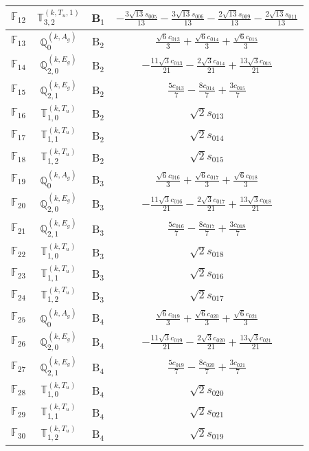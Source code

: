 \documentclass[fleqn,10pt,landscape]{article}
\begin{document}
\begin{itemize}
\begin{center}
\begin{longtable}{c|c|c|c}
$ \mathbb{F}_{12} $ & $\mathbb{T}_{3,2}^{(k,T_{u},1)}$ & B$_{1}$ & $- \frac{3 \sqrt{13} s_{005}}{13} - \frac{3 \sqrt{13} s_{006}}{13} - \frac{2 \sqrt{13} s_{009}}{13} - \frac{2 \sqrt{13} s_{011}}{13}$ \\ \hline
$ \mathbb{F}_{13} $ & $\mathbb{Q}_{0}^{(k,A_{g})}$ & B$_{2}$ & $\frac{\sqrt{6} c_{013}}{3} + \frac{\sqrt{6} c_{014}}{3} + \frac{\sqrt{6} c_{015}}{3}$ \\
$ \mathbb{F}_{14} $ & $\mathbb{Q}_{2,0}^{(k,E_{g})}$ & B$_{2}$ & $- \frac{11 \sqrt{3} c_{013}}{21} - \frac{2 \sqrt{3} c_{014}}{21} + \frac{13 \sqrt{3} c_{015}}{21}$ \\
$ \mathbb{F}_{15} $ & $\mathbb{Q}_{2,1}^{(k,E_{g})}$ & B$_{2}$ & $\frac{5 c_{013}}{7} - \frac{8 c_{014}}{7} + \frac{3 c_{015}}{7}$ \\
$ \mathbb{F}_{16} $ & $\mathbb{T}_{1,0}^{(k,T_{u})}$ & B$_{2}$ & $\sqrt{2} s_{013}$ \\
$ \mathbb{F}_{17} $ & $\mathbb{T}_{1,1}^{(k,T_{u})}$ & B$_{2}$ & $\sqrt{2} s_{014}$ \\
$ \mathbb{F}_{18} $ & $\mathbb{T}_{1,2}^{(k,T_{u})}$ & B$_{2}$ & $\sqrt{2} s_{015}$ \\ \hline
$ \mathbb{F}_{19} $ & $\mathbb{Q}_{0}^{(k,A_{g})}$ & B$_{3}$ & $\frac{\sqrt{6} c_{016}}{3} + \frac{\sqrt{6} c_{017}}{3} + \frac{\sqrt{6} c_{018}}{3}$ \\
$ \mathbb{F}_{20} $ & $\mathbb{Q}_{2,0}^{(k,E_{g})}$ & B$_{3}$ & $- \frac{11 \sqrt{3} c_{016}}{21} - \frac{2 \sqrt{3} c_{017}}{21} + \frac{13 \sqrt{3} c_{018}}{21}$ \\
$ \mathbb{F}_{21} $ & $\mathbb{Q}_{2,1}^{(k,E_{g})}$ & B$_{3}$ & $\frac{5 c_{016}}{7} - \frac{8 c_{017}}{7} + \frac{3 c_{018}}{7}$ \\
$ \mathbb{F}_{22} $ & $\mathbb{T}_{1,0}^{(k,T_{u})}$ & B$_{3}$ & $\sqrt{2} s_{018}$ \\
$ \mathbb{F}_{23} $ & $\mathbb{T}_{1,1}^{(k,T_{u})}$ & B$_{3}$ & $\sqrt{2} s_{016}$ \\
$ \mathbb{F}_{24} $ & $\mathbb{T}_{1,2}^{(k,T_{u})}$ & B$_{3}$ & $\sqrt{2} s_{017}$ \\ \hline
$ \mathbb{F}_{25} $ & $\mathbb{Q}_{0}^{(k,A_{g})}$ & B$_{4}$ & $\frac{\sqrt{6} c_{019}}{3} + \frac{\sqrt{6} c_{020}}{3} + \frac{\sqrt{6} c_{021}}{3}$ \\
$ \mathbb{F}_{26} $ & $\mathbb{Q}_{2,0}^{(k,E_{g})}$ & B$_{4}$ & $- \frac{11 \sqrt{3} c_{019}}{21} - \frac{2 \sqrt{3} c_{020}}{21} + \frac{13 \sqrt{3} c_{021}}{21}$ \\
$ \mathbb{F}_{27} $ & $\mathbb{Q}_{2,1}^{(k,E_{g})}$ & B$_{4}$ & $\frac{5 c_{019}}{7} - \frac{8 c_{020}}{7} + \frac{3 c_{021}}{7}$ \\
$ \mathbb{F}_{28} $ & $\mathbb{T}_{1,0}^{(k,T_{u})}$ & B$_{4}$ & $\sqrt{2} s_{020}$ \\
$ \mathbb{F}_{29} $ & $\mathbb{T}_{1,1}^{(k,T_{u})}$ & B$_{4}$ & $\sqrt{2} s_{021}$ \\
$ \mathbb{F}_{30} $ & $\mathbb{T}_{1,2}^{(k,T_{u})}$ & B$_{4}$ & $\sqrt{2} s_{019}$ \\
\end{longtable}
\end{center}


\end{itemize}
\end{document}
